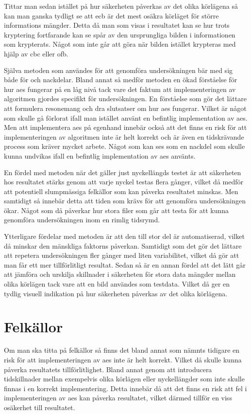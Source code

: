 Tittar man sedan istället på hur säkerheten påverkas av det olika körlägena så kan man ganska tydligt se att \acrshort{ecb} är det mest osäkra körläget för större informations mängder.
Detta då man som visas i resultatet kan se hur trots kryptering fortfarande kan se spår av den ursprungliga bilden i informationen som krypterats. Något som inte
går att göra när bilden istället krypteras med hjälp av \acrshort{cbc} eller \acrshort{ofb}.

Själva metoden som användes för att genomföra undersökningen bär med sig både för och nackdelar. Bland annat så medför metoden en ökad förståelse för hur \acrfull{aes} fungerar
på en låg nivå tack vare det faktum att implementeringen av algoritmen gjordes specifikt för undersökningen. En förståelse som gör det lättare att formulera resonemang och
dra slutsatser om hur \acrshort{aes} fungerar. Vilket är något som skulle gå förlorat ifall man istället använt en befintlig implementation av \acrshort{aes}. Men att implementera
\acrshort{aes} på egenhand innebär också att det finns en risk för att implementeringen av algoritmen inte är helt korrekt och är även en tidskrävande process som kräver
mycket arbete. Något som kan ses som en nackdel som skulle kunna undvikas ifall en befintlig implementation av \acrshort{aes} använts.

En fördel med metoden när det gäller just nyckellängds testet är att säkerheten hos resultatet stärks genom att varje nyckel testas flera gånger, vilket då medför att
potentiell slumpmässiga felkällor som kan påverka resultatet minskas. Men samtidigt så innebär detta att tiden som krävs för att genomföra undersökningen ökar. Något som
då påverkar hur stora filer som går att testa för att kunna genomföra undersökningen inom en rimlig tidsrymd.

Ytterligare fördelar med metoden är att den till stor del är automatiserad, vilket då minskar den mänskliga faktorns påverkan. Samtidigt som det gör det lättare att
repetera undersökningen fler gånger med liten variabilitet, vilket då gör att man får ett mer tillförlitligt resultat. Sedan så är
en annan fördel att det lätt går att jämföra och urskilja skillnader i säkerheten för stora data mängder mellan olika körlägen tack vare att en bild användes som testdata.
Vilket då ger en tydlig visuell indikation på hur säkerheten påverkas av det olika körlägena.

\section{Felkällor} %
\label{sec:errors}
Om man ska titta på felkällor så finns det bland annat som nämnts tidigare en risk för att implementeringen av \acrshort{aes} inte är helt korrekt. Vilket
då skulle kunna påverka resultatets tillförlitlighet. Bland annat genom att introducera tidskillnader mellan exempelvis olika körlägen eller nyckellängder som inte skulle finnas i en korrekt implementering. Detta innebär
då att det finns en risk att fel i implementeringen av \acrshort{aes} kan påverka resultatet, vilket därmed tillför en viss osäkerhet till resultatet. %

